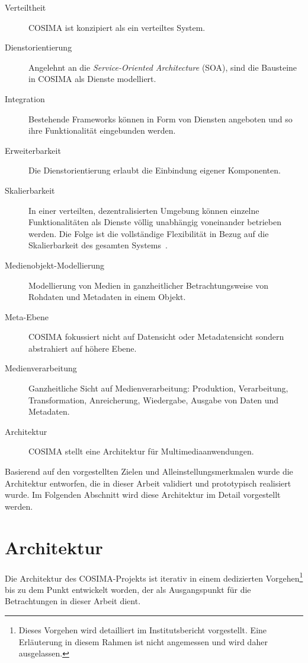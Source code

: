   \begin{description}
    \item[Verteiltheit] COSIMA ist konzipiert als ein verteiltes System.
    \item[Dienstorientierung] Angelehnt an die \emph{Service-Oriented Architecture} (SOA), sind die Bausteine in COSIMA als Dienste modelliert.
    \item[Integration] Bestehende Frameworks können in Form von Diensten angeboten und so ihre Funktionalität eingebunden werden.
    \item[Erweiterbarkeit] Die Dienstorientierung erlaubt die Einbindung eigener Komponenten.
    \item[Skalierbarkeit] In einer verteilten, dezentralisierten Umgebung können einzelne Funktionalitäten als Dienste völlig unabhängig voneinander betrieben werden. Die Folge ist die vollständige Flexibilität in Bezug auf die Skalierbarkeit des gesamten Systems~\citep[S. 294]{web_services_principles_and_technology}.
    \item[Medienobjekt-Modellierung] Modellierung von Medien in ganzheitlicher Betrachtungsweise von Rohdaten und Metadaten in einem Objekt.
    \item[Meta-Ebene] COSIMA fokussiert nicht auf Datensicht oder Metadatensicht sondern abstrahiert auf höhere Ebene.
    \item[Medienverarbeitung] Ganzheitliche Sicht auf Medienverarbeitung: Produktion, Verarbeitung, Transformation, Anreicherung, Wiedergabe, Ausgabe von Daten und Metadaten.
    \item[Architektur] COSIMA stellt eine Architektur für Multimediaanwendungen.
  \end{description}
  
  Basierend auf den vorgestellten Zielen und Alleinstellungsmerkmalen wurde die Architektur entworfen, die in dieser Arbeit validiert und prototypisch realisiert wurde. Im Folgenden Abschnitt wird diese Architektur im Detail vorgestellt werden.


\section{Architektur} %
\label{sec:architektur}

  Die Architektur des COSIMA-Projekts ist iterativ in einem dedizierten Vorgehen\footnote{Dieses Vorgehen wird detailliert im Institutsbericht vorgestellt. Eine Erläuterung in diesem Rahmen ist nicht angemessen und wird daher ausgelassen.} bis zu dem Punkt entwickelt worden, der als Ausgangspunkt für die Betrachtungen in dieser Arbeit dient.

